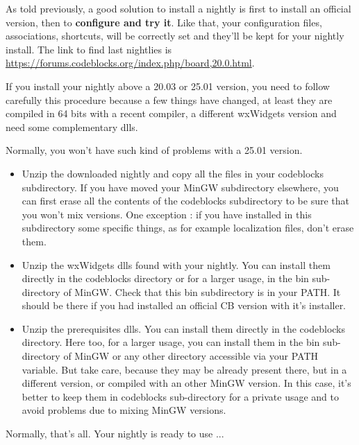 As told previously, a good solution to install a nightly is first to install an official version, then to \textbf{configure and try it}. Like that, your configuration files, associations, shortcuts, will be correctly set and they'll be kept for your nightly install. The link to find last nightlies is \url{https://forums.codeblocks.org/index.php/board,20.0.html}.

If you install your nightly above a 20.03 or 25.01 version, you need to follow carefully this procedure because a few things have changed, at least they are compiled in 64 bits with a recent compiler, a different wxWidgets version and need some complementary dlls.

Normally, you won't have such kind of problems with a 25.01 version.
\begin{itemize}
\item Unzip the downloaded nightly and copy all the files in your codeblocks subdirectory. If you have moved your MinGW subdirectory elsewhere, you can first erase all the contents of the codeblocks subdirectory to be sure that you won't mix versions. One exception : if you have installed in this subdirectory some specific things, as for example localization files, don't erase them.
\item Unzip the wxWidgets dlls found with your nightly. You can install them directly in the codeblocks directory or for a larger usage, in the bin sub-directory of MinGW. Check that this bin subdirectory is in your PATH. It should be there if you had installed an official CB version with it's installer.
\item Unzip the prerequisites dlls. You can install them directly in the codeblocks directory. Here too, for a larger usage, you can install them in the bin sub-directory of MinGW or any other directory accessible via your PATH variable. But take care, because they may be already present there, but in a different version, or compiled with an other MinGW version. In this case, it's better to keep them in codeblocks sub-directory for a private usage and to avoid problems due to mixing MinGW versions.
\end{itemize}


Normally, that's all. Your nightly is ready to use ...
